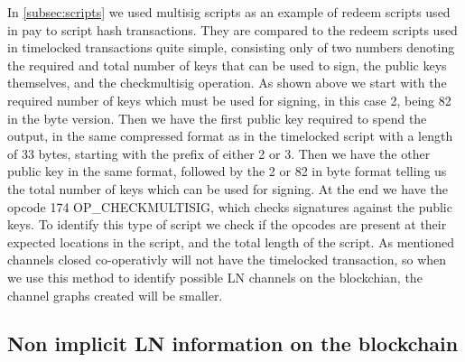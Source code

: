In \cref{subsec:scripts} we used multisig scripts as an example of redeem scripts used in pay to script hash transactions. They are compared to the redeem scripts used in timelocked transactions quite simple, consisting only of two numbers denoting the required and total number of keys that can be used to sign, the public keys themselves, and the checkmultisig operation. As shown above we start with the required number of keys which must be used for signing, in this case 2, being 82 in the byte version. Then we have the first public key required to spend the output, in the same compressed format as in the timelocked script with a length of 33 bytes, starting with the prefix of either 2 or 3. Then we have the other public key in the same format, followed by the 2 or 82 in byte format telling us the total number of keys which can be used for signing. At the end we have the opcode 174 OP\_CHECKMULTISIG, which checks signatures against the public keys. To identify this type of script we check if the opcodes are present at their expected locations in the script, and the total length of the script. As mentioned channels closed co-operativly will not have the timelocked transaction, so when we use this method to identify possible LN channels on the blockchian, the channel graphs created will be smaller.
\\

\subsection{Non implicit LN information on the blockchain}
\label{subsec:information_ln}

